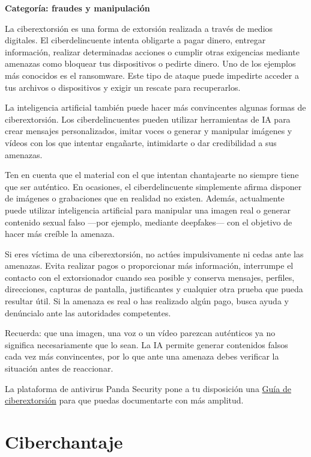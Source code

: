 \documentclass[
  spanish,
  a4paper,
  openany]{book}
\begin{document}
\textbf{Categoría: fraudes y manipulación}

La ciberextorsión es una forma de extorsión realizada a través de medios digitales. El ciberdelincuente intenta obligarte a pagar dinero, entregar información, realizar determinadas acciones o cumplir otras exigencias mediante amenazas como bloquear tus dispositivos o pedirte dinero. Uno de los ejemplos más conocidos es el ransomware. Este tipo de ataque puede impedirte acceder a tus archivos o dispositivos y exigir un rescate para recuperarlos.

La inteligencia artificial también puede hacer más convincentes algunas formas de ciberextorsión. Los ciberdelincuentes pueden utilizar herramientas de IA para crear mensajes personalizados, imitar voces o generar y manipular imágenes y vídeos con los que intentar engañarte, intimidarte o dar credibilidad a sus amenazas.

Ten en cuenta que el material con el que intentan chantajearte no siempre tiene que ser auténtico. En ocasiones, el ciberdelincuente simplemente afirma disponer de imágenes o grabaciones que en realidad no existen. Además, actualmente puede utilizar inteligencia artificial para manipular una imagen real o generar contenido sexual falso ---por ejemplo, mediante deepfakes--- con el objetivo de hacer más creíble la amenaza.

Si eres víctima de una ciberextorsión, no actúes impulsivamente ni cedas ante las amenazas. Evita realizar pagos o proporcionar más información, interrumpe el contacto con el extorsionador cuando sea posible y conserva mensajes, perfiles, direcciones, capturas de pantalla, justificantes y cualquier otra prueba que pueda resultar útil. Si la amenaza es real o has realizado algún pago, busca ayuda y denúncialo ante las autoridades competentes.

Recuerda: que una imagen, una voz o un vídeo parezcan auténticos ya no significa necesariamente que lo sean. La IA permite generar contenidos falsos cada vez más convincentes, por lo que ante una amenaza debes verificar la situación antes de reaccionar.

La plataforma de antivirus Panda Security pone a tu disposición una \href{https://www.pandasecurity.com/es/mediacenter/src/uploads/2016/02/Guia_Ciberextorsion-es.pdf}{Guía de ciberextorsión} para que puedas documentarte con más amplitud.

\section{Ciberchantaje}\label{ciberchantaje}
\end{document}
